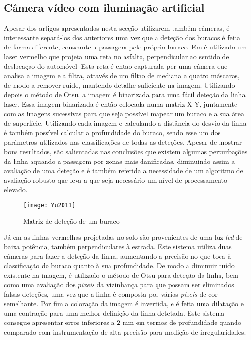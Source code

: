 \subsection{Câmera vídeo com iluminação artificial}
\label{subsec: camera_video_com_iluminacao_artificial}
Apesar dos artigos apresentados nesta secção utilizarem também câmeras, é interessante separá-los dos anteriores uma vez que a deteção dos buracos é feita de forma diferente, consoante a passagem pelo próprio buraco. Em \cite{Yu2011} é utilizado um laser vermelho que projeta uma reta no asfalto, perpendicular ao sentido de deslocação do automóvel. Esta reta é então capturada por uma câmera que analisa a imagem e a filtra, através de um filtro de mediana a quatro máscaras, de modo a remover ruído, mantendo detalhe suficiente na imagem.
Utilizando depois o método de Otsu, a imagem é binarizada para uma fácil deteção da linha laser.
Essa imagem binarizada é então colocada numa matriz X Y, juntamente com as imagens sucessivas para que seja possível mapear um buraco e a sua área de superfície.
Utilizando cada imagem e calculando a distância do desvio da linha é também possível calcular a profundidade do buraco, sendo esse um dos parâmetros utilizados nas classificações de todas as deteções.
Apesar de mostrar bons resultados, são salientadas nas conclusões que existem algumas perturbações da linha aquando a passagem por zonas mais danificadas, diminuindo assim a avaliação de uma deteção e é também referida a necessidade de um algoritmo de avaliação robusto que leva a que seja necessário um nível de processamento elevado.

\begin{figure}[htbp]
	\centering
	\texttt{[image: Yu2011]}
	\caption[Matriz de deteção de um buraco]{Matriz de deteção de um buraco \footnotemark}
	\label{fig:sensor_kinect}
\end{figure}

Já em \cite{He2011} as linhas vermelhas projetadas no solo são provenientes de uma luz \emph{led} de baixa potência, também perpendiculares à estrada. Este sistema utiliza duas câmeras para fazer a deteção da linha, aumentando a precisão no que toca à classificação do buraco quanto à sua profundidade.
De modo a diminuir ruído existente na imagem, é utilizado o método de Otsu para deteção da linha, bem como uma avaliação dos \emph{pixeis} da vizinhança para que possam ser eliminados falsas deteções, uma vez que a linha é composta por vários \emph{pixeis} de cor semelhante.
Por fim a coloração da imagem é invertida, e é feita uma dilatação e uma contração para uma melhor definição da linha detetada.
Este sistema consegue apresentar erros inferiores a 2 mm em termos de profundidade quando comparado com instrumentação de alta precisão para medição de irregularidades.

